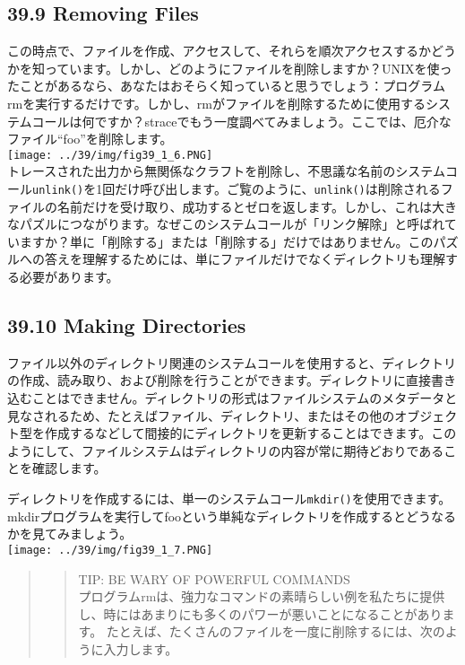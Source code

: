 \hypertarget{removing-files}{%
\subsection*{39.9 Removing Files}\label{removing-files}}

この時点で、ファイルを作成、アクセスして、それらを順次アクセスするかどうかを知っています。しかし、どのようにファイルを削除しますか？UNIXを使ったことがあるなら、あなたはおそらく知っていると思うでしょう：プログラムrmを実行するだけです。しかし、rmがファイルを削除するために使用するシステムコールは何ですか？straceでもう一度調べてみましょう。ここでは、厄介なファイル``foo''を削除します。\\
\texttt{[image: ../39/img/fig39\_1\_6.PNG]}\\
トレースされた出力から無関係なクラフトを削除し、不思議な名前のシステムコール\texttt{unlink()}を1回だけ呼び出します。ご覧のように、\texttt{unlink()}は削除されるファイルの名前だけを受け取り、成功するとゼロを返します。しかし、これは大きなパズルにつながります。なぜこのシステムコールが「リンク解除」と呼ばれていますか？単に「削除する」または「削除する」だけではありません。このパズルへの答えを理解するためには、単にファイルだけでなくディレクトリも理解する必要があります。

\hypertarget{making-directories}{%
\subsection*{39.10 Making Directories}\label{making-directories}}

ファイル以外のディレクトリ関連のシステムコールを使用すると、ディレクトリの作成、読み取り、および削除を行うことができます。ディレクトリに直接書き込むことはできません。ディレクトリの形式はファイルシステムのメタデータと見なされるため、たとえばファイル、ディレクトリ、またはその他のオブジェクト型を作成するなどして間接的にディレクトリを更新することはできます。このようにして、ファイルシステムはディレクトリの内容が常に期待どおりであることを確認します。

ディレクトリを作成するには、単一のシステムコール\texttt{mkdir()}を使用できます。mkdirプログラムを実行してfooという単純なディレクトリを作成するとどうなるかを見てみましょう。\\
\texttt{[image: ../39/img/fig39\_1\_7.PNG]}

\begin{quote}
\begin{quote}
TIP: BE WARY OF POWERFUL COMMANDS\\
プログラムrmは、強力なコマンドの素晴らしい例を私たちに提供し、時にはあまりにも多くのパワーが悪いことになることがあります。
たとえば、たくさんのファイルを一度に削除するには、次のように入力します。
\end{quote}
\end{quote}

